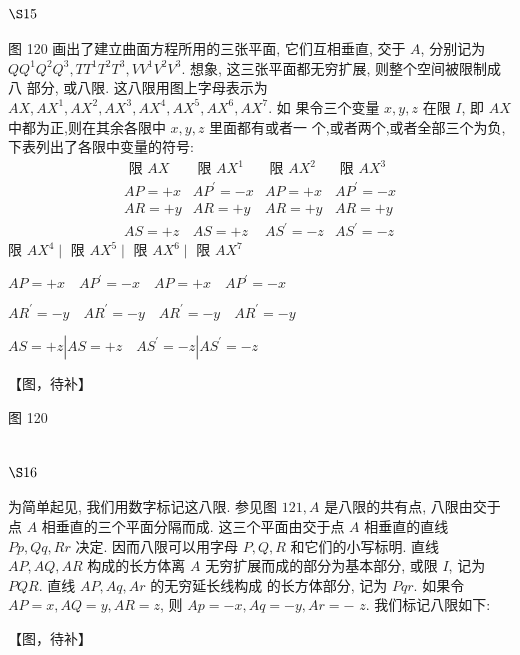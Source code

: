 \section{$\S 15$}

图 120 画出了建立曲面方程所用的三张平面, 它们互相垂直, 交于 $A$, 分别记为 $Q Q^{1} Q^{2} Q^{3}, T T^{1} T^{2} T^{3}, V V^{1} V^{2} V^{3}$. 想象, 这三张平面都无穷扩展, 则整个空间被限制成八 部分, 或八限. 这八限用图上字母表示为 $A X, A X^{1}, A X^{2}, A X^{3}, A X^{4}, A X^{5}, A X^{6}, A X^{7}$. 如 果令三个变量 $x, y, z$ 在限 $I$, 即 $A X$ 中都为正,则在其余各限中 $x, y, z$ 里面都有或者一 个,或者两个,或者全部三个为负,下表列出了各限中变量的符号:
\[
\begin{array}{l|l|l|l|l}
\text { 限 } A X & \text { 限 } A X^{1} & \text { 限 } A X^{2} & \text { 限 } A X^{3} \\
A P=+x & A P^{\prime}=-x & A P=+x & A P^{\prime}=-x \\
A R=+y & A R=+y & A R=+y & A R=+y \\
A S=+z & A S=+z & A S^{\prime}=-z & A S^{\prime}=-z
\end{array}
\]
限 $A X^{4} \mid$ 限 $A X^{5} \mid$ 限 $A X^{6} \mid$ 限 $A X^{7}$

$A P=+x \quad A P^{\prime}=-x \quad A P=+x \quad A P^{\prime}=-x$

$A R^{\prime}=-y \quad A R^{\prime}=-y \quad A R^{\prime}=-y \quad A R^{\prime}=-y$

$A S=+z\left|A S=+z \quad A S^{\prime}=-z\right| A S^{\prime}=-z$


【图，待补】

图 120

\section{$\S 16$}

为简单起见, 我们用数字标记这八限. 参见图 $121, A$ 是八限的共有点, 八限由交于点 $A$ 相垂直的三个平面分隔而成. 这三个平面由交于点 $A$ 相垂直的直线 $P p, Q q, R r$ 决定. 因而八限可以用字母 $P, Q, R$ 和它们的小写标明. 直线 $A P, A Q, A R$ 构成的长方体离 $A$ 无穷扩展而成的部分为基本部分, 或限 $I$, 记为 $P Q R$. 直线 $A P, A q, A r$ 的无穷延长线构成 的长方体部分, 记为 $P q r$. 如果令 $A P=x, A Q=y, A R=z$, 则 $A p=-x, A q=-y, A r=-$ $z$. 我们标记八限如下: 


【图，待补】

